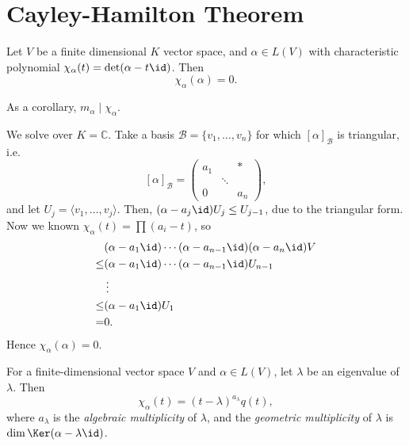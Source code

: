 \documentclass[12pt]{article}
\begin{document}
\newpage

\section{Cayley-Hamilton Theorem}%
\label{sec:cayley_hamilton_theorem}

\begin{theorem}
	Let $V$ be a finite dimensional $K$ vector space, and $\alpha \in L(V)$ with characteristic polynomial $\chi_{\alpha}(t) = \det(\alpha - t \id)$. Then
	\[
		\chi_{\alpha}(\alpha) = 0
	.\]
\end{theorem}

As a corollary, $m_{\alpha} \mid \chi_{\alpha}$.

\begin{proofbox}
	We solve over $K = \mathbb{C}$. Take a basis $\mathcal{B} = \{v_1, \ldots, v_n\}$ for which $[\alpha]_{\mathcal{B}}$ is triangular, i.e.
	\[
		[\alpha]_{\mathcal{B}} = 
		\begin{pmatrix}
			a_1 &  & \ast \\
			    & \ddots & \\
			0 & & a_n
		\end{pmatrix}
	,\]
	and let $U_j = \langle v_1, \ldots, v_j\rangle$. Then, $(\alpha - a_j \id)U_j \leq U_{j-1}$, due to the triangular form. Now we known $\chi_{\alpha}(t) = \prod (a_i - t)$, so
	\begin{align*}
		&(\alpha - a_1 \id) \cdots (\alpha - a_{n-1} \id) (\alpha - a_n \id) V \\
		\leq& (\alpha - a_1 \id) \cdots (\alpha - a_{n-1} \id) U_{n-1} \\
		    & \,\vdots \\
		\leq& (\alpha - a_1 \id) U_1 \\
		=& 0.
	\end{align*}
	Hence $\chi_{\alpha}(\alpha) = 0$.
\end{proofbox}

\begin{definition}[Multiplicity]
	For a finite-dimensional vector space $V$ and $\alpha \in L(V)$, let $\lambda$ be an eigenvalue of $\lambda$. Then
	\[
		\chi_{\alpha}(t) = (t - \lambda)^{a_{\lambda}}q(t)
	,\]
	where $a_{\lambda}$ is the \textit{algebraic multiplicity} of $\lambda$, and the \textit{geometric multiplicity} of $\lambda$ is $\dim \Ker (\alpha - \lambda \id)$.
\end{definition}
\end{document}

